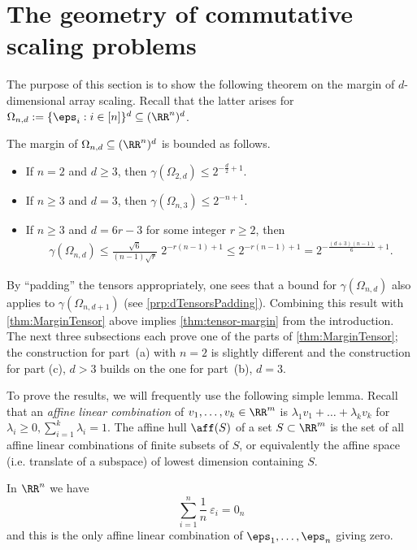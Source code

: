 \section{The geometry of commutative scaling problems}\label{sec:MarginComm}

The purpose of this section is to show the following theorem on the margin of $d$-dimensional array scaling. Recall that the latter arises for $\Omega_{n,d} := \{\eps_i: i \in [n]\}^d \subseteq (\RR^n)^d$.

\begin{thm}\label{thm:MarginTensor}
The margin of $\Omega_{n,d} \subseteq (\RR^n)^d$ is bounded as follows.
	\begin{itemize}
	\item[(a)] If $n=2$ and $d \geq 3$, then
	$
	\gamma \left(\Omega_{2,d} \right)  \leq  2^{-\frac{d}{2} + 1}.
	$
	\item[(b)] If $n \geq 3$ and $d = 3$, then $\gamma(\Omega_{n,3}) \leq 2^{-n+1}$.
	\item[(c)] If $n \geq 3$ and $d = 6 r - 3$ for some integer $r \geq 2$, then
		\begin{align*}
		\gamma(\Omega_{n,d})  \leq \frac{\sqrt{6}}{(n-1)\sqrt{r}} \; 2^{-r(n-1) + 1} 
		\leq 2^{- r (n-1) + 1} = 2^{- \frac{(d+3)(n-1)}{6} + 1}.
		\end{align*}
		\end{itemize}
\end{thm}
By ``padding'' the tensors appropriately, one sees that a bound for $\gamma(\Omega_{n,d})$ also applies to $\gamma(\Omega_{n,d+1})$ (see  \cref{prp:dTensorsPadding}). Combining this result with \cref{thm:MarginTensor} above implies \cref{thm:tensor-margin} from the introduction. The next three subsections each prove one of the parts of \cref{thm:MarginTensor}; the construction for part~(a) with $n = 2$ is slightly different and the construction for part (c), $d > 3$ builds on the one for part~(b), $d = 3$.

To prove the results, we will frequently use the following simple lemma. Recall that an \emph{affine linear combination} of $v_1, \dots, v_k \in \RR^m$ is $\lambda_1 v_1 + \dots + \lambda_k v_k$ for $\lambda_i \geq 0, \sum_{i = 1}^k \lambda_i = 1$. The affine hull $\aff(S)$ of a set $S\subset \RR^m$ is the set of all affine linear combinations of finite subsets of $S$, or equivalently the affine space (i.e. translate of a subspace) of lowest dimension containing $S$.

\begin{lem}\label{lem:convCombEps-i}
In $\RR^n$ we have
\begin{equation}\label{eq:SumEps-i}
\sum_{i=1}^n \frac{1}{n} \: \varepsilon_i = 0_n 
\end{equation}
and this is the only affine linear combination of $\eps_1,\ldots,\eps_n$ giving zero.
\end{lem}

